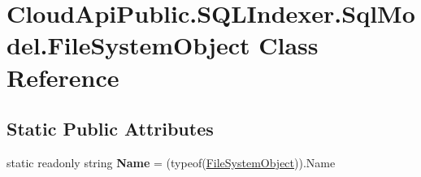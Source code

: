 \hypertarget{class_cloud_api_public_1_1_s_q_l_indexer_1_1_sql_model_1_1_file_system_object}{\section{Cloud\-Api\-Public.\-S\-Q\-L\-Indexer.\-Sql\-Model.\-File\-System\-Object Class Reference}
\label{class_cloud_api_public_1_1_s_q_l_indexer_1_1_sql_model_1_1_file_system_object}
}
\subsection*{Static Public Attributes}
\begin{DoxyCompactItemize}
\item 
\hypertarget{class_cloud_api_public_1_1_s_q_l_indexer_1_1_sql_model_1_1_file_system_object_a890578f7c8dccd0af6350cf45e665bff}{static readonly string {\bfseries Name} = (typeof(\hyperlink{class_cloud_api_public_1_1_s_q_l_indexer_1_1_sql_model_1_1_file_system_object}{File\-System\-Object})).Name}\label{class_cloud_api_public_1_1_s_q_l_indexer_1_1_sql_model_1_1_file_system_object_a890578f7c8dccd0af6350cf45e665bff}

\end{DoxyCompactItemize}
